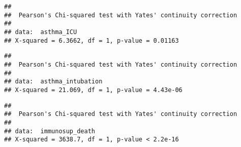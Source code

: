 \documentclass[
]{article}
\newenvironment{Shaded}{\begin{snugshade}}{\end{snugshade}}
\newcommand{\CommentTok}[1]{\textcolor[rgb]{0.56,0.35,0.01}{\textit{#1}}}
\newcommand{\FunctionTok}[1]{\textcolor[rgb]{0.00,0.00,0.00}{#1}}
\newcommand{\NormalTok}[1]{#1}
\newcommand{\OtherTok}[1]{\textcolor[rgb]{0.56,0.35,0.01}{#1}}
\newcommand{\SpecialCharTok}[1]{\textcolor[rgb]{0.00,0.00,0.00}{#1}}
\begin{document}
\begin{Shaded}
\end{Shaded}

\begin{verbatim}
## 
##  Pearson's Chi-squared test with Yates' continuity correction
## 
## data:  asthma_ICU
## X-squared = 6.3662, df = 1, p-value = 0.01163
\end{verbatim}

\begin{Shaded}
\end{Shaded}

\begin{verbatim}
## 
##  Pearson's Chi-squared test with Yates' continuity correction
## 
## data:  asthma_intubation
## X-squared = 21.069, df = 1, p-value = 4.43e-06
\end{verbatim}

\begin{Shaded}
\end{Shaded}

\begin{verbatim}
## 
##  Pearson's Chi-squared test with Yates' continuity correction
## 
## data:  immunosup_death
## X-squared = 3638.7, df = 1, p-value < 2.2e-16
\end{verbatim}
\end{document}
